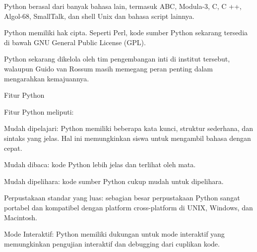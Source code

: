 \vspace{14pt}
\noindent 
{\fontsize{14pt}{14pt}\selectfont Python berasal dari banyak bahasa lain, termasuk ABC, Modula-3, C, C ++, Algol-68, SmallTalk, dan shell Unix dan bahasa script lainnya. \\} \par
\vspace{14pt}
\noindent 
{\fontsize{14pt}{14pt}\selectfont Python memiliki hak cipta. Seperti Perl, kode sumber Python sekarang tersedia di bawah GNU General Public License (GPL). \\} \par
\vspace{14pt}
\noindent 
{\fontsize{14pt}{14pt}\selectfont Python sekarang dikelola oleh tim pengembangan inti di institut tersebut, walaupun Guido van Rossum masih memegang peran penting dalam mengarahkan kemajuannya. \\} \par
\vspace{14pt}
\noindent 
{\fontsize{14pt}{14pt}\selectfont Fitur Python \\} \par
\noindent 
{\fontsize{14pt}{14pt}\selectfont Fitur Python meliputi: \\} \par
\vspace{14pt}
\noindent 
{\fontsize{14pt}{14pt}\selectfont Mudah dipelajari: Python memiliki beberapa kata kunci, struktur sederhana, dan sintaks yang jelas. Hal ini memungkinkan siswa untuk mengambil bahasa dengan cepat. \\} \par
\vspace{14pt}
\noindent 
{\fontsize{14pt}{14pt}\selectfont Mudah dibaca: kode Python lebih jelas dan terlihat oleh mata. \\} \par
\vspace{14pt}
\noindent 
{\fontsize{14pt}{14pt}\selectfont Mudah dipelihara: kode sumber Python cukup mudah untuk dipelihara. \\} \par
\vspace{14pt}
\noindent 
{\fontsize{14pt}{14pt}\selectfont Perpustakaan standar yang luas: sebagian besar perpustakaan Python sangat portabel dan kompatibel dengan platform cross-platform di UNIX, Windows, dan Macintosh. \\} \par
\noindent 
{\fontsize{14pt}{14pt}\selectfont Mode Interaktif: Python memiliki dukungan untuk mode interaktif yang memungkinkan pengujian interaktif dan debugging dari cuplikan kode. \\} \par
